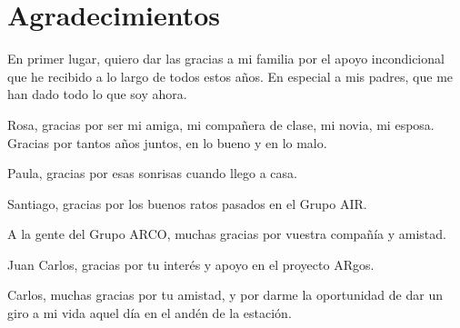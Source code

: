 \chapter{Agradecimientos}

En primer lugar, quiero dar las gracias a mi familia por el apoyo incondicional que he recibido a lo largo de todos estos años. En especial a mis padres, que me han dado todo lo que soy ahora.

Rosa, gracias por ser mi amiga, mi compañera de clase, mi novia, mi esposa. Gracias por tantos años juntos, en lo bueno y en lo malo.

Paula, gracias por esas sonrisas cuando llego a casa.

Santiago, gracias por los buenos ratos pasados en el Grupo AIR.

A la gente del Grupo ARCO, muchas gracias por vuestra compañía y amistad.

Juan Carlos, gracias por tu interés y apoyo en el proyecto ARgos.

Carlos, muchas gracias por tu amistad, y por darme la oportunidad de dar un giro a mi vida aquel día en el andén de la estación.



